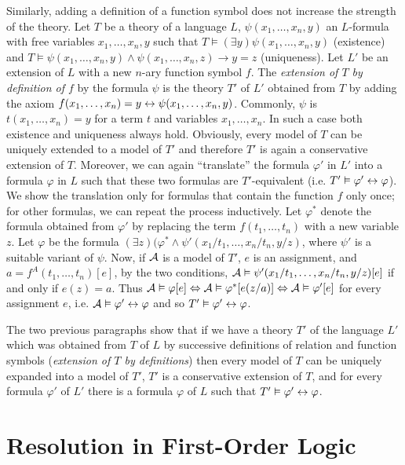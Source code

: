 Similarly, adding a definition of a function symbol does not increase the strength of the theory. Let $T$ be a theory of a language $L$, $\psi(x_1, \dots, x_n, y)$ an $L$-formula with free variables $x_1, \dots, x_n, y$ such that $T \vDash (\exists y)\psi(x_1, \dots, x_n, y)$ (existence) and $T \vDash \psi(x_1, \dots, x_n, y) \land \psi(x_1, \dots, x_n, z) \to y = z$ (uniqueness).
Let $L'$ be an extension of $L$ with a new $n$-ary function symbol $f$. The \emph{extension of $T$ by definition of $f$} by the formula $\psi$ is the theory $T'$ of $L'$ obtained from $T$ by adding the axiom $f(x_1, \dots, x_n) = y \leftrightarrow \psi(x_1, \dots, x_n, y)$. Commonly, $\psi$ is $t(x_1, \dots, x_n) = y$ for a term $t$ and variables $x_1, \dots, x_n$. In such a case both existence and uniqueness always hold. Obviously, every model of $T$ can be uniquely extended to a model of $T'$ and therefore $T'$ is again a conservative extension of $T$. Moreover, we can again ``translate'' the formula $\varphi'$ in $L'$ into a formula $\varphi$ in $L$ such that these two formulas are $T'$-equivalent (i.e. $T' \vDash \varphi' \leftrightarrow \varphi$). We show the translation only for formulas that contain the function $f$ only once; for other formulas, we can repeat the process inductively. Let $\varphi^*$ denote the formula obtained from $\varphi'$ by replacing the term $f(t_1, \dots, t_n)$ with a new variable $z$. Let $\varphi$ be the formula $(\exists z)(\varphi^* \land \psi'(x_1/t_1, \dots, x_n/t_n, y/z)$, where $\psi'$ is a suitable variant of $\psi$. Now, if $\mathcal{A}$ is a model of $T'$, $e$ is an assignment, and $a = f^A(t_1, \dots, t_n)[e]$, by the two conditions, $\mathcal{A} \vDash \psi'(x_1/t_1, \dots, x_n/t_n, y/z)[e]$ if and only if $e(z) = a$. Thus $\mathcal{A} \vDash \varphi[e] \Leftrightarrow \mathcal{A} \vDash \varphi^*[e(z/a)] \Leftrightarrow \mathcal{A} \vDash \varphi'[e]$ for every assignment $e$, i.e. $\mathcal{A} \vDash \varphi' \leftrightarrow \varphi$ and so $T' \vDash \varphi' \leftrightarrow \varphi$.

The two previous paragraphs show that if we have a theory $T'$ of the language $L'$ which was obtained from $T$ of $L$ by successive definitions of relation and function symbols (\emph{extension of $T$ by definitions}) then every model of $T$ can be uniquely expanded into a model of $T'$, $T'$ is a conservative extension of $T$, and for every formula $\varphi'$ of $L'$ there is a formula $\varphi$ of $L$ such that $T' \vDash \varphi' \leftrightarrow \varphi$.

\chapter{Resolution in First-Order Logic}

